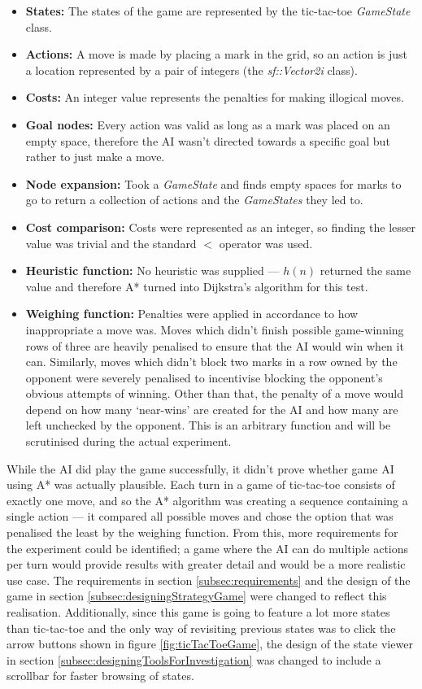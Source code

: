 \documentclass[11pt, a4paper]{report}
\begin{document}
\begin{itemize}
  \item \textbf{States:} The states of the game are represented by the tic-tac-toe \emph{GameState} class.
  \item \textbf{Actions:} A move is made by placing a mark in the grid, so an action is just a location represented by a pair of integers (the \emph{sf::Vector2i} class).
  \item \textbf{Costs:} An integer value represents the penalties for making illogical moves.
  \item \textbf{Goal nodes:} Every action was valid as long as a mark was placed on an empty space, therefore the AI wasn't directed towards a specific goal but rather to just make a move.
  \item \textbf{Node expansion:} Took a \emph{GameState} and finds empty spaces for marks to go to return a collection of actions and the \emph{GameStates} they led to.
  \item \textbf{Cost comparison:} Costs were represented as an integer, so finding the lesser value was trivial and the standard $<$ operator was used.
  \item \textbf{Heuristic function:} No heuristic was supplied --- $h(n)$ returned the same value and therefore A* turned into Dijkstra's algorithm for this test.
  \item \textbf{Weighing function:} Penalties were applied in accordance to how inappropriate a move was. Moves which didn't finish possible game-winning rows of three are heavily penalised to ensure that the AI would win when it can. Similarly, moves which didn't block two marks in a row owned by the opponent were severely penalised to incentivise blocking the opponent's obvious attempts of winning. Other than that, the penalty of a move would depend on how many `near-wins' are created for the AI and how many are left unchecked by the opponent. This is an arbitrary function and will be scrutinised during the actual experiment.
\end{itemize}

While the AI did play the game successfully, it didn't prove whether game AI using A* was actually plausible. Each turn in a game of tic-tac-toe consists of exactly one move, and so the A* algorithm was creating a sequence containing a single action --- it compared all possible moves and chose the option that was penalised the least by the weighing function. From this, more requirements for the experiment could be identified; a game where the AI can do multiple actions per turn would provide results with greater detail and would be a more realistic use case. The requirements in section \ref{subsec:requirements} and the design of the game in section \ref{subsec:designingStrategyGame} were changed to reflect this realisation. Additionally, since this game is going to feature a lot more states than tic-tac-toe and the only way of revisiting previous states was to click the arrow buttons shown in figure \ref{fig:ticTacToeGame}, the design of the state viewer in section \ref{subsec:designingToolsForInvestigation} was changed to include a scrollbar for faster browsing of states.
\end{document}
